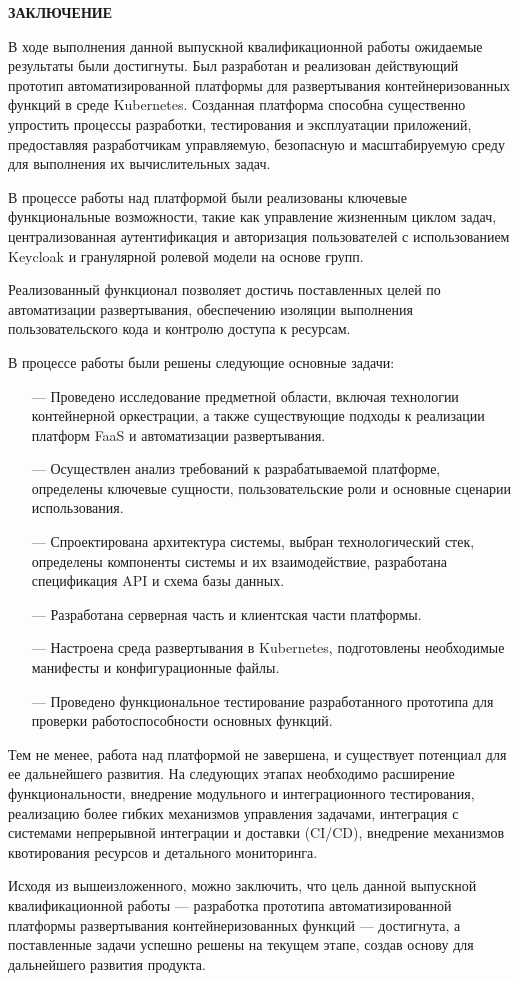 \newpage
\begin{center}
  \textbf{\large ЗАКЛЮЧЕНИЕ}
\end{center}

В ходе выполнения данной выпускной квалификационной работы ожидаемые результаты были достигнуты. Был разработан и реализован действующий прототип автоматизированной платформы для развертывания контейнеризованных функций в среде Kubernetes. Созданная платформа способна существенно упростить процессы разработки, тестирования и эксплуатации приложений, предоставляя разработчикам управляемую, безопасную и масштабируемую среду для выполнения их вычислительных задач.

В процессе работы над платформой были реализованы ключевые функциональные возможности, такие как управление жизненным циклом задач, централизованная аутентификация и авторизация пользователей с использованием Keycloak и гранулярной ролевой модели на основе групп.

Реализованный функционал позволяет достичь поставленных целей по автоматизации развертывания, обеспечению изоляции выполнения пользовательского кода и контролю доступа к ресурсам.

В процессе работы были решены следующие основные задачи:

\begin{itemize}
\item[---]Проведено исследование предметной области, включая технологии контейнерной оркестрации, а также существующие подходы к реализации платформ FaaS и автоматизации развертывания.
\item[---]Осуществлен анализ требований к разрабатываемой платформе, определены ключевые сущности, пользовательские роли и основные сценарии использования.
\item[---]Спроектирована архитектура системы, выбран технологический стек, определены компоненты системы и их взаимодействие, разработана спецификация API и схема базы данных.
\item[---]Разработана серверная часть и клиентская части платформы.
\item[---]Настроена среда развертывания в Kubernetes, подготовлены необходимые манифесты и конфигурационные файлы.
\item[---]Проведено функциональное тестирование разработанного прототипа для проверки работоспособности основных функций.
\end{itemize}

Тем не менее, работа над платформой не завершена, и существует потенциал для ее дальнейшего развития. На следующих этапах необходимо расширение функциональности, внедрение модульного и интеграционного тестирования, реализацию более гибких механизмов управления задачами, интеграция с системами непрерывной интеграции и доставки (CI/CD), внедрение механизмов квотирования ресурсов и детального мониторинга.

Исходя из вышеизложенного, можно заключить, что цель данной выпускной квалификационной работы — разработка прототипа автоматизированной платформы развертывания контейнеризованных функций — достигнута, а поставленные задачи успешно решены на текущем этапе, создав основу для дальнейшего развития продукта.
